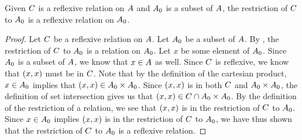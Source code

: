 \documentclass[../main.tex]{subfiles}
\begin{document}
\begin{thm}
	Given \({C}\) is a reflexive relation on \({A}\) and
	\({A_0}\) is a subset of \({A}\), the restriction of
	\({C}\) to \({A_0}\) is a reflexive relation on
	\({A_0}\).
\end{thm}
\begin{proof}
	Let \({C}\) be a reflexive relation on \({A}\). Let
	\({A_0}\) be a subset of \({A}\). By ,
	the restriction of \({C}\) to \({A_0}\) is a relation
	on \({A_0}\). Let \(x\) be some element of \({A_0}\).
	Since \({A_0}\) is a subset of \({A}\), we know that
	\(x \in {A}\) as well. Since \({C}\) is reflexive,
	we know that \(({x},{x})\) must be in \({C}\). Note
	that by the definition of the cartesian product, \(x \in {A_0}\)
	implies that
	\(({x},{x}) \in {{A_0}} \times {{A_0}}\).
	Since \(({x},{x})\) is in both \({C}\) and
	\({{A_0}} \times {{A_0}}\), the definition
	of set intersection gives us that
	\(({x},{x}) \in {{C}} \cap {{{A_0}} \times{{A_0}}}\).
	By the definition of the restriction of a relation, we see that
	\(({x},{x})\) is in the restriction of \({C}\) to
	\({A_0}\). Since \(x \in {A_0}\) implies
	\(({x},{x})\) is in the restriction of \({C}\) to
	\({A_0}\), we have thus shown that the restriction of
	\({C}\) to \({A_0}\) is a reflexive relation.
\end{proof}
\end{document}
